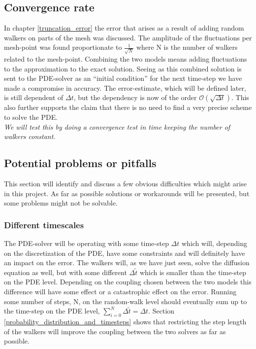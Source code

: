 \subsection{Convergence rate}

In chapter \ref{truncation_error} the error that arises as a result of adding random walkers on parts of the mesh was discussed. 
The amplitude of the fluctuations per mesh-point was found proportionate to $\frac{1}{\sqrt{N}}$ where N is the number of walkers related to the mesh-point. 
Combining the two models means adding fluctuations to the approximation to the exact solution. Seeing as this combined solution is sent to the PDE-solver as an ``initial condition'' for the next time-step we have made a compromise in accuracy. The error-estimate, which will be defined later, is still dependent of $\Delta t$, but the dependency is now of the order $\mathcal{O}(\sqrt{\Delta t})$. 
This also further supports the claim that there is no need to find a very precise scheme to solve the PDE.\\
\emph{We will test this by doing a convergence test in time keeping the number of walkers constant.}

\subsection{Potential problems or pitfalls}\label{problems_and_pitfalls}
 
This section will identify and discuss a few obvious difficulties which might arise in this project. As far as possible solutions or workarounds will be presented, but some problems might not be solvable.

\subsubsection{Different timescales}
  The PDE-solver will be operating with some time-step $\Delta t$ which will, depending on the discretization of the PDE, have some constraints and will definitely have an impact on the error. 
  The walkers will, as we have just seen, solve the diffusion equation as well, but with some different $\Delta \tilde{t}$ which is smaller than the time-step on the PDE level. 
  Depending on the coupling chosen between the two models this difference will have some effect or a catastrophic effect on the error. 
  Running some number of steps, N, on the random-walk level should eventually sum up to the time-step on the PDE level, $\sum\limits_{i=0}^N \Delta\tilde{t} = \Delta t$. 
  Section \ref{probability_distribution_and_timesteps} shows that restricting the step length of the walkers will improve the coupling between the two solvers as far as possible.

